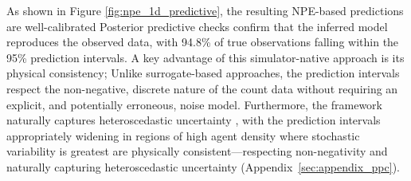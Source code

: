 \documentclass{article}
\providecommand{\DIFaddtex}[1]{{\protect\color{blue} \sf #1}} %
\providecommand{\DIFdeltex}[1]{{\protect\color{red} \scriptsize #1}} %
\providecommand{\DIFaddbegin}{} %
\providecommand{\DIFaddend}{} %
\providecommand{\DIFdelbegin}{} %
\providecommand{\DIFdelend}{} %
\providecommand{\DIFadd}[1]{\texorpdfstring{\DIFaddtex{#1}}{#1}} %
\providecommand{\DIFdel}[1]{\texorpdfstring{\DIFdeltex{#1}}{}} %
\newcommand{\DIFscaledelfig}{0.5}
\newlength{\DIFdelgraphicswidth} %
\newlength{\DIFdelgraphicsheight} %
\newcommand{\DIFaddincludegraphics}[2][]{{\color{blue}\fbox{\DIFOincludegraphics[#1]{#2}}}} %
\newcommand{\DIFdelincludegraphics}[2][]{%
\sbox{\DIFdelgraphicsbox}{\DIFOincludegraphics[#1]{#2}}%
\settoboxwidth{\DIFdelgraphicswidth}{\DIFdelgraphicsbox} %
\settoboxtotalheight{\DIFdelgraphicsheight}{\DIFdelgraphicsbox} %
\scalebox{\DIFscaledelfig}{%
\parbox[b]{\DIFdelgraphicswidth}{\usebox{\DIFdelgraphicsbox}\\[-\baselineskip] \rule{\DIFdelgraphicswidth}{0em}}\llap{\resizebox{\DIFdelgraphicswidth}{\DIFdelgraphicsheight}{%
\setlength{\unitlength}{\DIFdelgraphicswidth}%
\begin{picture}(1,1)%
\thicklines\linethickness{2pt} %
{\color[rgb]{1,0,0}\put(0,0){\framebox(1,1){}}}%
{\color[rgb]{1,0,0}\put(0,0){\line( 1,1){1}}}%
{\color[rgb]{1,0,0}\put(0,1){\line(1,-1){1}}}%
\end{picture}%
}\hspace*{3pt}}} %
} %
\DeclareRobustCommand{\DIFaddbegin}{\DIFOaddbegin \let\includegraphics\DIFaddincludegraphics} %
\DeclareRobustCommand{\DIFaddend}{\DIFOaddend \let\includegraphics\DIFOincludegraphics} %
\DeclareRobustCommand{\DIFdelbegin}{\DIFOdelbegin \let\includegraphics\DIFdelincludegraphics} %
\DeclareRobustCommand{\DIFdelend}{\DIFOaddend \let\includegraphics\DIFOincludegraphics} %
\begin{document}
\DIFdel{As shown in Figure \ref{fig:npe_1d_predictive}, the resulting NPE-based predictions are well-calibrated}\DIFdelend \DIFaddbegin \DIFadd{Posterior predictive checks confirm that the inferred model reproduces the observed data}\DIFaddend , with 94.8\% of \DIFdelbegin \DIFdel{true }\DIFdelend observations falling within the 95\% prediction intervals. \DIFdelbegin \DIFdel{A key advantage of this simulator-native approach is its physical consistency; }\DIFdelend \DIFaddbegin \DIFadd{Unlike surrogate-based approaches, }\DIFaddend the prediction intervals \DIFdelbegin \DIFdel{respect the non-negative, discrete nature of the count data without requiring an explicit, and potentially erroneous, noise model. Furthermore, the framework naturally captures heteroscedastic uncertainty , with the prediction intervals appropriately widening in regions of high agent density where stochastic variability is greatest}\DIFdelend \DIFaddbegin \DIFadd{are physically consistent---respecting non-negativity and naturally capturing heteroscedastic uncertainty (Appendix~\ref{sec:appendix_ppc})}\DIFaddend .
\end{document}
